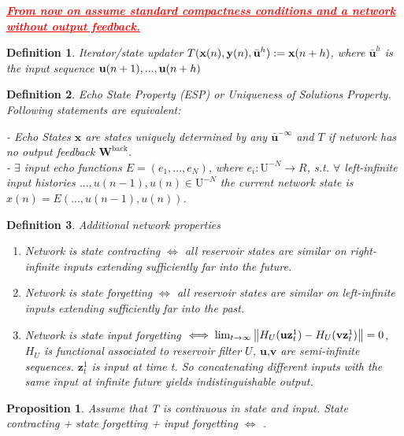 \documentclass{article}
\newtheorem{definition}{Definition}
\newtheorem{proposition}{Proposition}
\begin{document}
\textit{\textbf{\textcolor{red}{\underline{From now on assume standard compactness conditions and a network without output feedback.}}}}

\begin{definition}
Iterator/state updater $T(\textbf x(n), \textbf y(n),\bar{\textbf u}^h) := \textbf x(n + h)
$, where $\bar{\textbf{u}}^h$ is the input sequence $\textbf u(n + 1), . . . , \textbf u(n + h)$
\end{definition}

\begin{definition}
Echo State Property (ESP) or Uniqueness of Solutions Property. Following statements are equivalent:

- Echo States $\textbf{x}$ are states uniquely determined by any $\bar{\textbf{u}}^{-\infty}$ and $T$ if network has no output feedback $\textbf{W}^{\text{back}}$.\\

- $\exists$ input echo functions $E = (e_1,...,e_N)$, where $e_i :\text{U}^{-N} \rightarrow R$, s.t. $\forall$ left-infinite input histories $..., u(n - 1), u(n) \in \text{U}^{- N}$ the current network state is $x(n) = E(..., u(n - 1), u(n))$.
\end{definition}

\begin{definition} Additional network properties

\begin{enumerate}[label=\Roman*.]
    \item Network is state contracting $\iff$ all reservoir states are similar on right-infinite inputs extending sufficiently far into the future.
    
    \item Network is state forgetting $\iff$ all reservoir states are similar on left-infinite inputs extending sufficiently far into the past.
    
    \item Network is state input forgetting $\iff \lim_{t\rightarrow \infty} \norm{H_U(\textbf{uz}_t^1) - H_U(\textbf{vz}_t^1)} = 0$, $H_U$ is functional associated to reservoir filter $U$, $\textbf{u,v}$ are semi-infinite sequences. $\textbf{z}_t^1$ is input at time t. So concatenating different inputs with the same input at infinite future yields indistinguishable output.
\end{enumerate}

\end{definition}

\begin{proposition}
Assume that T is continuous in state and input.
State contracting + state forgetting + input forgetting $\iff$ . 
\end{proposition}
\end{document}
